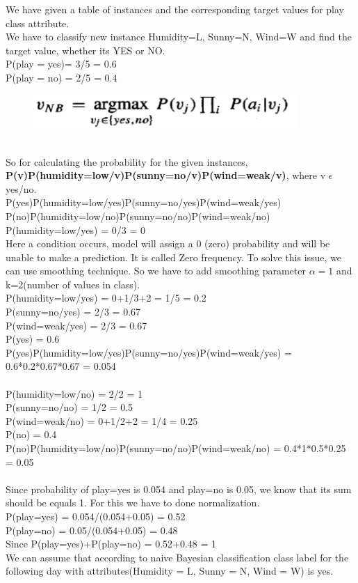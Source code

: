 We have given a table of instances and the corresponding target values for play class attribute.\\
We have to classify new instance {Humidity=L, Sunny=N, Wind=W} and find the target value, whether its YES or NO.\\
P(play = yes)= 3/5 = 0.6\\
P(play = no) = 2/5 = 0.4\\
\begin{figure}[htp]
    \centering
    \includegraphics[width=10cm]{Images/A11_img2.png}
\end{figure}\\
So for calculating the probability for the given instances,\\
\textbf{P(v)P(humidity=low/v)P(sunny=no/v)P(wind=weak/v)}, where v $\epsilon$ {yes/no}.\\
P(yes)P(humidity=low/yes)P(sunny=no/yes)P(wind=weak/yes)\\
P(no)P(humidity=low/no)P(sunny=no/no)P(wind=weak/no)\\
P(humidity=low/yes) = 0/3 = 0\\
Here a condition occurs, model will assign a 0 (zero) probability and will be unable to make a prediction. It is called Zero frequency. To solve this issue, we can use smoothing technique. So we have to add smoothing parameter $\alpha=1$ and k=2(number of values in class).\\
P(humidity=low/yes) = 0+1/3+2 = 1/5 = 0.2\\
P(sunny=no/yes) = 2/3 = 0.67\\
P(wind=weak/yes) = 2/3 = 0.67\\
P(yes) = 0.6\\
P(yes)P(humidity=low/yes)P(sunny=no/yes)P(wind=weak/yes) = 0.6*0.2*0.67*0.67 = 0.054\\\\
P(humidity=low/no) = 2/2 = 1\\
P(sunny=no/no) = 1/2 = 0.5\\
P(wind=weak/no) = 0+1/2+2 = 1/4 = 0.25\\
P(no) = 0.4\\
P(no)P(humidity=low/no)P(sunny=no/no)P(wind=weak/no) = 0.4*1*0.5*0.25 = 0.05\\\\
Since probability of play=yes is 0.054 and play=no is 0.05, we know that its sum should be equals 1. For this we have to done normalization.\\
P(play=yes) = 0.054/(0.054+0.05) = 0.52\\
P(play=no) = 0.05/(0.054+0.05) = 0.48\\
Since P(play=yes)+P(play=no) = 0.52+0.48 = 1\\
We can assume that according to naive Bayesian classification class label for the following day with attributes(Humidity = L, Sunny = N, Wind = W) is yes.\\
